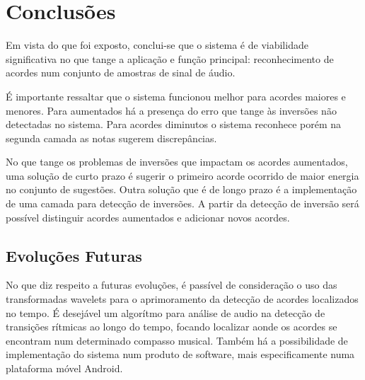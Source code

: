 \chapter{Conclusões}
\label{chap:conclusoes}

Em vista do que foi exposto, conclui-se que o sistema é de viabilidade significativa no que tange a aplicação e função principal: reconhecimento de acordes num conjunto de amostras de sinal de áudio.

É importante ressaltar que o sistema funcionou melhor para acordes maiores e menores. Para aumentados há a presença do erro que tange às inversões não detectadas no sistema. Para acordes diminutos o sistema reconhece porém na segunda camada as notas sugerem discrepâncias. 

No que tange os problemas de inversões que impactam os acordes aumentados, uma solução de curto prazo é sugerir o primeiro acorde ocorrido de maior energia no conjunto de sugestões. Outra solução que é de longo prazo é a implementação de uma camada para detecção de inversões. A partir da detecção de inversão será possível distinguir acordes aumentados e adicionar novos acordes.

\section{Evoluções Futuras}
\label{sec:precondicoes}

No que diz respeito a futuras evoluções, é passível de consideração o uso das transformadas wavelets para o aprimoramento da detecção de acordes localizados no tempo. É desejável um algorítmo para análise de audio na detecção de transições rítmicas ao longo do tempo, focando localizar aonde os acordes se encontram num determinado compasso musical. Também há a possibilidade de implementação do sistema num produto de software, mais especificamente numa plataforma móvel Android.